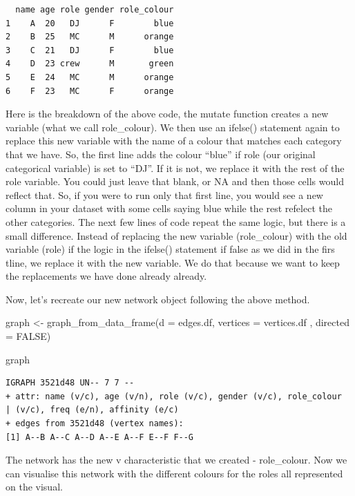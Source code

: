 \documentclass[
  letterpaper,
  DIV=11,
  numbers=noendperiod]{scrreprt}
\newenvironment{Shaded}{\begin{snugshade}}{\end{snugshade}}
\newcommand{\AttributeTok}[1]{\textcolor[rgb]{0.40,0.45,0.13}{#1}}
\newcommand{\ConstantTok}[1]{\textcolor[rgb]{0.56,0.35,0.01}{#1}}
\newcommand{\FunctionTok}[1]{\textcolor[rgb]{0.28,0.35,0.67}{#1}}
\newcommand{\NormalTok}[1]{\textcolor[rgb]{0.00,0.23,0.31}{#1}}
\newcommand{\OtherTok}[1]{\textcolor[rgb]{0.00,0.23,0.31}{#1}}
\begin{document}
\begin{verbatim}
  name age role gender role_colour
1    A  20   DJ      F        blue
2    B  25   MC      M      orange
3    C  21   DJ      F        blue
4    D  23 crew      M       green
5    E  24   MC      M      orange
6    F  23   MC      F      orange
\end{verbatim}

Here is the breakdown of the above code, the mutate function creates a
new variable (what we call role\_colour). We then use an ifelse()
statement again to replace this new variable with the name of a colour
that matches each category that we have. So, the first line adds the
colour ``blue'' if role (our original categorical variable) is set to
``DJ''. If it is not, we replace it with the rest of the role variable.
You could just leave that blank, or NA and then those cells would
reflect that. So, if you were to run only that first line, you would see
a new column in your dataset with some cells saying blue while the rest
refelect the other categories. The next few lines of code repeat the
same logic, but there is a small difference. Instead of replacing the
new variable (role\_colour) with the old variable (role) if the logic in
the ifelse() statement if false as we did in the firs tline, we replace
it with the new variable. We do that because we want to keep the
replacements we have done already already.

Now, let's recreate our new network object following the above method.

\begin{Shaded}
\begin{Highlighting}[]
\NormalTok{graph }\OtherTok{\textless{}{-}} \FunctionTok{graph\_from\_data\_frame}\NormalTok{(}\AttributeTok{d =}\NormalTok{ edges.df, }\AttributeTok{vertices =}\NormalTok{ vertices.df , }\AttributeTok{directed =} \ConstantTok{FALSE}\NormalTok{)}

\NormalTok{graph}
\end{Highlighting}
\end{Shaded}

\begin{verbatim}
IGRAPH 3521d48 UN-- 7 7 -- 
+ attr: name (v/c), age (v/n), role (v/c), gender (v/c), role_colour
| (v/c), freq (e/n), affinity (e/c)
+ edges from 3521d48 (vertex names):
[1] A--B A--C A--D A--E A--F E--F F--G
\end{verbatim}

The network has the new v characteristic that we created - role\_colour.
Now we can visualise this network with the different colours for the
roles all represented on the visual.
\end{document}
